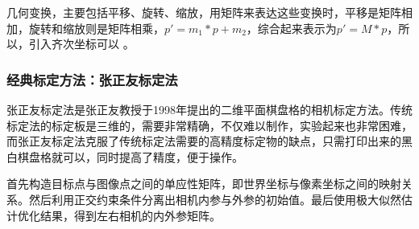 \documentclass{article}
\begin{document}
几何变换，主要包括平移、旋转、缩放，用矩阵来表达这些变换时，平移是矩阵相加，旋转和缩放则是矩阵相乘，$p' = m_1*p+ m_2$，综合起来表示为$p' = M*p$，所以，引入齐次坐标可以{\color[RGB]{128, 0, 255} }。




\subsubsection{经典标定方法：张正友标定法}

张正友标定法是张正友教授于1998年提出的二维平面棋盘格的相机标定方法。传统标定法的标定板是三维的，需要非常精确，不仅难以制作，实验起来也非常困难，而张正友标定法克服了传统标定法需要的高精度标定物的缺点，只需打印出来的黑白棋盘格就可以，同时提高了精度，便于操作。

首先构造目标点与图像点之间的单应性矩阵，即世界坐标与像素坐标之间的映射关系。然后利用正交约束条件分离出相机内参与外参的初始值。最后使用极大似然估计优化结果，得到左右相机的内外参矩阵。
\end{document}
